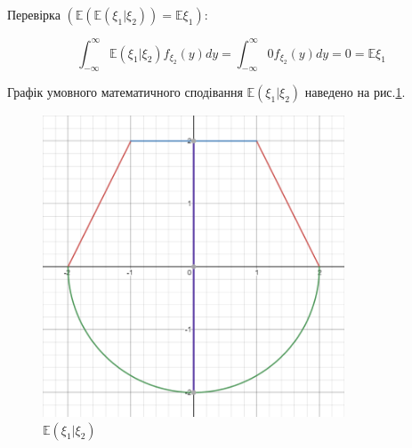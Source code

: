 \documentclass[14pt, a4paper, ukrainian]{extreport}
\begin{document}
 	Перевірка $(\mathbb{E}(\mathbb{E}(\xi_1|\xi_2))=\mathbb{E}\xi_1)$:
 	
 	$$ \int_{-\infty}^{\infty}\mathbb{E}(\xi_1|\xi_2)f_{\xi_2}(y)dy = \int_{-\infty}^{\infty}0f_{\xi_2}(y)dy = 0 = \mathbb{E}\xi_1
 	$$
 	
 	Графік умовного математичного сподівання $\mathbb{E}(\xi_1|\xi_2)$ наведено на рис.\ref{im:Ex|y}.
 	
 	\begin{figure}[H]
 		\centering
 		\includegraphics[width=0.8\textwidth]{./Image/Im_21_E_x_y.png}
 		\caption{$\mathbb{E}(\xi_1|\xi_2)$}
 		\label{im:Ex|y}
 	\end{figure}
 	
\end{document}
